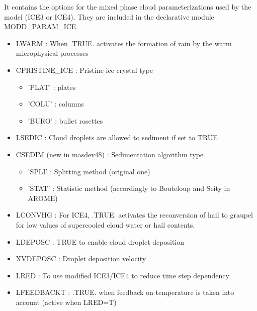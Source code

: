 It contains the options for the mixed phase cloud parameterizations
used  by the model (ICE3 or ICE4). They are included in the declarative module
MODD\_PARAM\_ICE

\begin{itemize}
\item
LWARM : When .TRUE. activates the
formation of rain by the warm microphysical processes

\item
CPRISTINE\_ICE :
Pristine ice crystal type
\begin{itemize}
\item{'PLAT'} : plates 
\item{'COLU'} : columns
\item{'BURO'} : bullet rosettes
\end{itemize}

\item
LSEDIC :
Cloud droplets are allowed to sediment if set to TRUE
\item
CSEDIM (new in masdev48) :
Sedimentation algorithm type
\begin{itemize}
\item{'SPLI'} : Splitting method (original one)
\item{'STAT'} : Statistic method (accordingly to Bouteloup and Seity in AROME) 
\end{itemize}

\item
LCONVHG : For ICE4, .TRUE. activates the
reconversion of hail to graupel for low values of supercooled cloud water or hail contents.

\item
LDEPOSC : TRUE to enable cloud droplet deposition

\item
XVDEPOSC : Droplet deposition velocity

\item 
LRED  : To use modified ICE3/ICE4 to reduce time step dependency

\item 
LFEEDBACKT  :  .TRUE. when feedback on temperature is taken into account (active when LRED=T)


\end{itemize}
